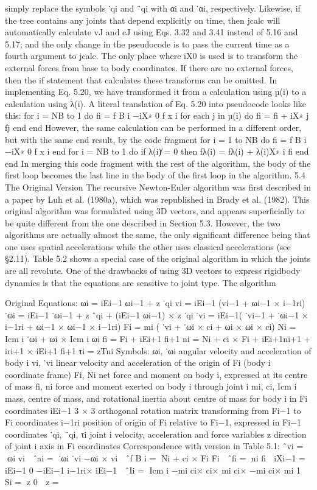 simply replace the symbols ˙qi and ¨qi with αi and ˙αi, respectively. Likewise, if the tree contains any joints that depend explicitly on time, then jcalc will automatically calculate vJ and cJ using Eqs. 3.32 and 3.41 instead of 5.16 and 5.17; and the only change in the pseudocode is to pass the current time as a fourth argument to jcalc. The only place where iX0 is used is to transform the external forces from base to body coordinates. If there are no external forces, then the if statement that calculates these transforms can be omitted. In implementing Eq. 5.20, we have transformed it from a calculation using µ(i) to a calculation using λ(i). A literal translation of Eq. 5.20 into pseudocode looks like this: for i = NB to 1 do fi = f B i −iX∗ 0 f x i for each j in µ(i) do fi = fi + iX∗ j fj end end However, the same calculation can be performed in a different order, but with the same end result, by the code fragment for i = 1 to NB do fi = f B i −iX∗ 0 f x i end for i = NB to 1 do if λ(i)̸ = 0 then fλ(i) = fλ(i) + λ(i)X∗ i fi end end In merging this code fragment with the rest of the algorithm, the body of the first loop becomes the last line in the body of the first loop in the algorithm. 5.4 The Original Version The recursive Newton-Euler algorithm was first described in a paper by Luh et al. (1980a), which was republished in Brady et al. (1982). This original algorithm was formulated using 3D vectors, and appears superficially to be quite different from the one described in Section 5.3. However, the two algorithms are actually almost the same, the only significant difference being that one uses spatial accelerations while the other uses classical accelerations (see §2.11). Table 5.2 shows a special case of the original algorithm in which the joints are all revolute. One of the drawbacks of using 3D vectors to express rigidbody dynamics is that the equations are sensitive to joint type. The algorithm

Original Equations: ωi = iEi−1 ωi−1 + z ˙qi vi = iEi−1 (vi−1 + ωi−1 × i−1ri) ˙ωi = iEi−1 ˙ωi−1 + z ¨qi + (iEi−1 ωi−1) × z ˙qi ˙vi = iEi−1( ˙vi−1 + ˙ωi−1 × i−1ri + ωi−1 × ωi−1 × i−1ri) Fi = mi ( ˙vi + ˙ωi × ci + ωi × ωi × ci) Ni = Icm i ˙ωi + ωi × Icm i ωi fi = Fi + iEi+1 fi+1 ni = Ni + ci × Fi + iEi+1ni+1 + iri+1 × iEi+1 fi+1 τi = zTni Symbols: ωi, ˙ωi angular velocity and acceleration of body i vi, ˙vi linear velocity and acceleration of the origin of Fi (body i coordinate frame) Fi, Ni net force and moment on body i, expressed at its centre of mass fi, ni force and moment exerted on body i through joint i mi, ci, Icm i mass, centre of mass, and rotational inertia about centre of mass for body i in Fi coordinates iEi−1 3 × 3 orthogonal rotation matrix transforming from Fi−1 to Fi coordinates i−1ri position of origin of Fi relative to Fi−1, expressed in Fi−1 coordinates ˙qi, ¨qi, τi joint i velocity, acceleration and force variables z direction of joint i axis in Fi coordinates Correspondence with version in Table 5.1: ˆvi = ωi vi  ˆai =  ˙ωi ˙vi −ωi × vi  ˆf B i = Ni + ci × Fi Fi  ˆfi = ni fi  iXi−1 =  iEi−1 0 −iEi−1 i−1ri× iEi−1  ˆIi = Icm i −mi ci× ci× mi ci× −mi ci× mi 1  Si =  z 0  z =

